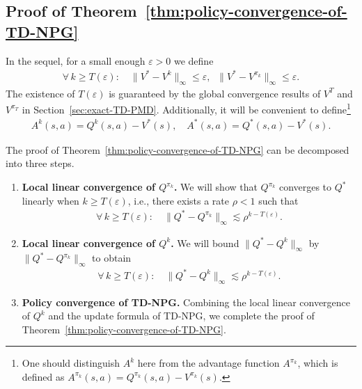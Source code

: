 \documentclass[10pt]{article}
\theoremstyle{plain}
\theoremstyle{definition}
\begin{document}
\subsection{Proof of Theorem~\ref{thm:policy-convergence-of-TD-NPG}}\label{TD-NPG-policy-convergence}
In the sequel, for a small enough $\varepsilon > 0$ we define
\begin{align*}
    \forall\, k\geq T(\varepsilon): \quad \| V^* - V^k \|_\infty \leq \varepsilon, \;\; \| V^* - V^{\pi_k} \|_\infty \leq \varepsilon.
\end{align*}
The existence of $T(\varepsilon)$ is guaranteed by the global convergence results of $V^T$ and $V^{\pi_T}$ in Section~\ref{sec:exact-TD-PMD}. Additionally, it will be convenient to define\footnote{One should distinguish $A^k$ here from the advantage function $A^{\pi_k}$, which is defined as $A^{\pi_k}(s,a) = Q^{\pi_k}(s,a) - V^{\pi_k}(s)$.}
\begin{align*}
    A^k(s,a) = Q^k(s,a) - V^*(s), \quad A^*(s,a) = Q^*(s,a) - V^*(s).
\end{align*}

The proof of Theorem~\ref{thm:policy-convergence-of-TD-NPG} can be decomposed into three steps.
\begin{enumerate}
    \item \textbf{Local linear convergence of $Q^{\pi_k}$.} We will show that $Q^{\pi_k}$ converges to $Q^*$ linearly when $k \geq T(\varepsilon)$, i.e., there exists a rate $\rho < 1$ such that
    \begin{align*}
        \forall\, k\geq T(\varepsilon): \quad \| Q^* - Q^{\pi_k} \|_\infty \lesssim \rho^{k-T(\varepsilon)}.
    \end{align*}
    \item \textbf{Local linear convergence of $Q^k$.} We will bound $\| Q^* - Q^k \|_\infty$ by $\| Q^* - Q^{\pi_k} \|_\infty$ to obtain
    \begin{align*}
        \forall\, k\geq T(\varepsilon): \quad \| Q^* - Q^k \|_\infty \lesssim \rho^{k-T(\varepsilon)}.
    \end{align*}
    \item \textbf{Policy convergence of TD-NPG.} Combining the local linear convergence of $Q^k$ and the update formula of TD-NPG, we complete the proof of Theorem~\ref{thm:policy-convergence-of-TD-NPG}.
\end{enumerate}
\end{document}
